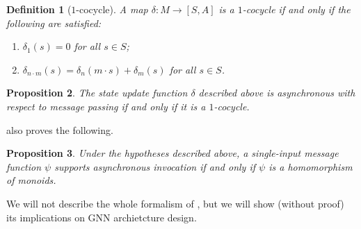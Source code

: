 \documentclass[11pt,a4paper,openright,twoside]{report}
\theoremstyle{plain}
\newtheorem{proposition}{Proposition}
\newtheorem{definition}[proposition]{Definition}
\theoremstyle{definition}
\begin{document}
\begin{definition}[$1$-cocycle]
  \label{def: cocycle}
  A map $\delta: M \to [S,A]$ is a $1$-cocycle if and only if the following are satisfied:
  \begin{enumerate}
    \item $\delta_1(s) = 0$ for all $s \in S$;
    \item $\delta_{n \cdot m}(s) = \delta_{n}(m \cdot s) + \delta_m(s)$ for all $s \in S$.
  \end{enumerate} 
\end{definition}

\begin{proposition}
  The state update function $\delta$ described above is asynchronous with respect to message passing if and only if it is a $1$-cocycle.
\end{proposition}

\cite{dudzik2024asynchronous} also proves the following.

\begin{proposition}
  Under the hypotheses described above, a single-input message function $\psi$ supports asynchronous invocation if and only if $\psi$ is a homomorphism of monoids.
\end{proposition}

We will not describe the whole formalism of \cite{dudzik2024asynchronous}, but we will show (without proof) its implications on GNN archietcture design. 
\end{document}
